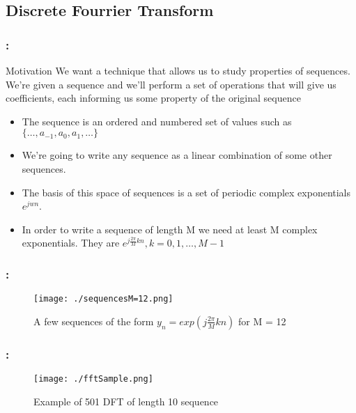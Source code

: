 \documentclass{beamer}
\begin{document}
\subsection{Discrete Fourrier Transform}

\begin{frame}
  \frametitle{\secname : \subsecname}
  \begin{block}{Motivation}
    We want a technique that allows us to study properties of sequences. We're given a sequence and we'll perform a set
    of operations that will give us coefficients, each informing us some property of the original sequence
  \end{block}
  \begin{itemize}
    \item The sequence is an ordered and numbered set of values such as $\{ \ldots, a_{-1}, a_0, a_1,\ldots\}$
    \item We're going to write any sequence as a linear combination of some other sequences. 
    \item The basis of this space of sequences is a set of periodic complex exponentials $e^{jwn}$. 
    \item In order to write a sequence of length M we need at least M complex exponentials. They are
      $e^{j \frac{2\pi}{M}kn}, k = 0,1,\ldots,M-1$
  \end{itemize}
\end{frame}
\begin{frame}
  \frametitle{\secname : \subsecname}
  \begin{figure}
    \texttt{[image: ./sequencesM=12.png]}
    \caption{A few sequences of the form $y_n = exp(j\frac{2\pi}{M}kn)$ for M = 12}
  \end{figure}
\end{frame}
\begin{frame}
  \frametitle{\secname : \subsecname}
  \begin{figure}
    \texttt{[image: ./fftSample.png]}
    \caption{Example of 501 DFT of length 10 sequence}
  \end{figure}
\end{frame}
\end{document}
